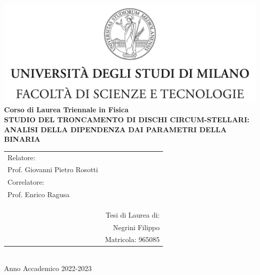 \begin{titlepage}
    \centering
    \vspace*{\fill}
    \includegraphics[width=\textwidth]{Immagini/tesiSCIENZE_TECNOLOGIE.jpg}
    \vspace*{\fill}
    \\
    \large\textbf{Corso di Laurea Triennale in Fisica}
    \\
    \vspace*{\fill}
    \vspace*{\fill}
    \vspace*{\fill}
    \large\textbf{STUDIO DEL TRONCAMENTO DI DISCHI CIRCUM-STELLARI: ANALISI DELLA DIPENDENZA DAI PARAMETRI DELLA BINARIA}
    \vspace*{\fill}
    \vspace*{\fill}
    \vspace*{\fill}
    \vspace*{\fill}
    \\
    \begin{tabular}{l r}
         \small Relatore: & \\
         \small Prof. Giovanni Pietro Rosotti &  \\
         \small Correlatore: & \\
         \small Prof. Enrico Ragusa & \\
        \\
        \\
        \\

        & \small Tesi di Laurea di: \\
        & \small Negrini Filippo \\
        & \small Matricola: 965085 \\
    \end{tabular}
    \vspace*{\fill}
    \vspace*{\fill}
    \\
    \large Anno Accademico 2022-2023
\end{titlepage}
